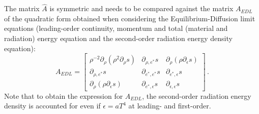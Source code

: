 \documentclass[times,doublespace]{fldauth}%
\begin{document}
The matrix $\hat{A}$ is symmetric and needs to be compared against the matrix $A_{EDL}$ of the quadratic form obtained when considering the Equilibrium-Diffusion limit equations (leading-order continuity, momentum and total (material and radiation) energy equation and the second-order radiation energy density equation):
%
 \begin{equation}
 A _{EDL}= 
\begin{bmatrix}
\rho^{-2}\partial_{\rho} \left( \rho^2 \partial_{\rho} s \right) & \partial_{\rho,e^*} s & \partial_{\rho} \left( \rho \partial_{\epsilon} s \right) \\
 \partial_{\rho,e^*} s & \partial_{e^*,e^*} s & \partial_{e^*,\epsilon} s \\
 \partial_{\rho} \left( \rho \partial_{\epsilon} s \right) & \partial_{e^*,\epsilon} s & \partial_{\epsilon,\epsilon} s
\end{bmatrix}
\,.
\end{equation}
%
Note that to obtain the expression for $A_{EDL}$, the second-order radiation energy density is accounted for even if $\epsilon = aT^4$ at leading- and first-order.
\end{document}
